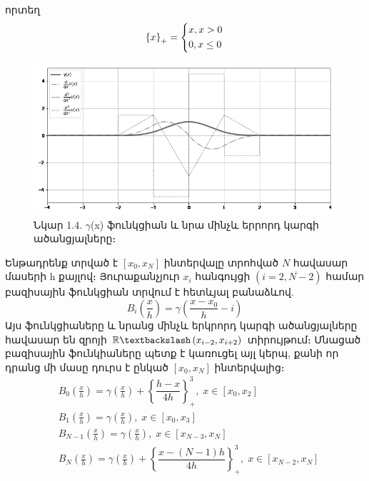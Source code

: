\documentclass[fleqn, bachelor,subf,12pt,notitlepage]{article}
\begin{document}
որտեղ
\begin{equation}
\left\{x\right\}_{+}=
\begin{dcases}
x, x > 0 \\
0, x \leq 0	
\end{dcases}
\end{equation}
\begin{figure}[H]
\centering
\includegraphics[width=1.0\textwidth]{images/cubic_compact_support_basis}
\captionsetup{labelformat=empty}
\caption{Նկար 1.4. $\gamma$(x) ֆունկցիան և նրա մինչև երրորդ կարգի ածանցյալները։}
\end{figure}
Ենթադրենք տրված է $\left[x_{0}, x_{N}\right]$ ինտերվալը տրոհված $N$ հավասար մասերի h քայլով։ Յուրաքանչյուր $x_{i}$ հանգույցի $(i=\overline{2, N-2})$ համար բազիսային ֆունկցիան տրվում է հետևյալ բանաձևով.
\begin{equation}
B_{i}\left(\dfrac{x}{h}\right)=\gamma \left(\frac{x-x_{0}}{h}-i\right)
\end{equation}
Այս ֆունկցիաները և նրանց մինչև երկրորդ կարգի ածանցյալները հավասար են զրոյի $\mathbb{R} \textbackslash \left(x_{i-2}, x_{i+2}\right)$ տիրույթում։
Մնացած բազիսային ֆունկիաները պետք է կառուցել այլ կերպ, քանի որ դրանց մի մասը դուրս է ընկած  $\left[x_{0}, x_{N}\right]$ ինտերվալից։
\begin{equation}
\begin{aligned}
&B_{0}\left(\frac{x}{h}\right) = \gamma \left(\frac{x}{h}\right) + \left\{\dfrac{h - x}{4h}\right\}^{3}_{+} , \; x \in \left[x_{0}, x_{2}\right] \\
&B_{1}\left(\frac{x}{h}\right) = \gamma \left(\frac{x}{h}\right), \; x \in \left[x_{0}, x_{3}\right]\\
&B_{N-1}\left(\frac{x}{h}\right) = \gamma \left(\frac{x}{h}\right), \; x \in \left[x_{N-3}, x_{N}\right] \\
&B_{N}\left(\frac{x}{h}\right) = \gamma \left(\frac{x}{h}\right) + \left\{\dfrac{x - (N-1)h}{4h}\right\}^{3}_{+} , \; x \in \left[x_{N-2}, x_{N}\right]
\end{aligned}
\end{equation}
\end{document}
